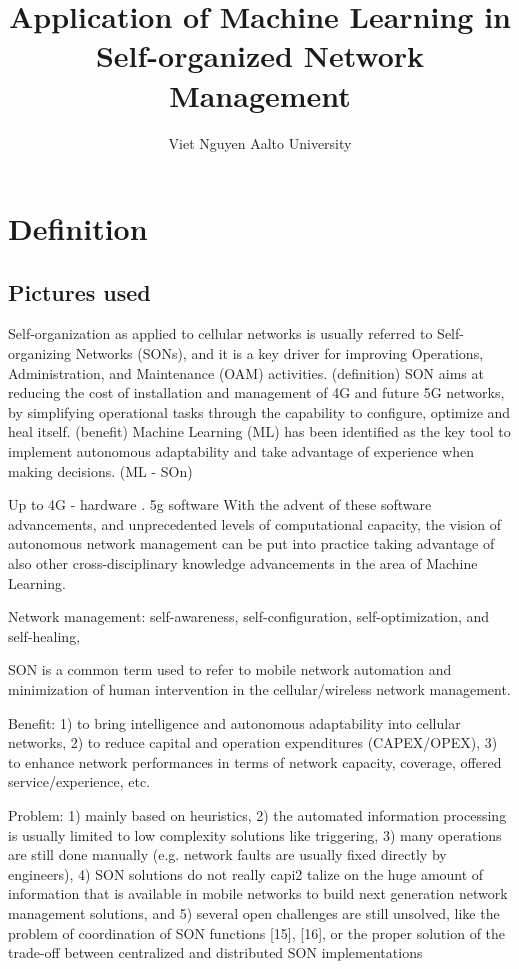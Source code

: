 \documentclass[12pt]{article}
\title{Application of Machine Learning in Self-organized Network Management}
\author{Viet Nguyen \newline Aalto University}
\date{}
\begin{document}
\maketitle

\tableofcontents
\clearpage

\section{Definition}

\subsection{Pictures used}


Self-organization as applied to cellular networks
is usually referred to Self-organizing Networks (SONs), and it
is a key driver for improving Operations, Administration, and
Maintenance (OAM) activities. (definition)
SON aims at reducing the cost of
installation and management of 4G and future 5G networks, by
simplifying operational tasks through the capability to configure,
optimize and heal itself. (benefit)
Machine Learning
(ML) has been identified as the key tool to implement autonomous
adaptability and take advantage of experience when making
decisions. (ML - SOn)

Up to 4G - hardware . 5g software 
With the advent of these software advancements,
and unprecedented levels of computational capacity, the vision
of autonomous network management can be put into practice
taking advantage of also other cross-disciplinary knowledge
advancements in the area of Machine Learning.

Network management: self-awareness, self-configuration,
self-optimization, and self-healing,

SON is a common term used to
refer to mobile network automation and minimization of human
intervention in the cellular/wireless network management.

Benefit: 1) to bring intelligence and autonomous
adaptability into cellular networks, 2) to reduce capital and
operation expenditures (CAPEX/OPEX), 3) to enhance network
performances in terms of network capacity, coverage,
offered service/experience, etc.

Problem: 1) mainly based on heuristics,
2) the automated information processing is usually limited to
low complexity solutions like triggering, 3) many operations
are still done manually (e.g. network faults are usually fixed
directly by engineers), 4) SON solutions do not really capi2
talize on the huge amount of information that is available in
mobile networks to build next generation network management
solutions, and 5) several open challenges are still unsolved,
like the problem of coordination of SON functions [15], [16],
or the proper solution of the trade-off between centralized and
distributed SON implementations
\end{document}
